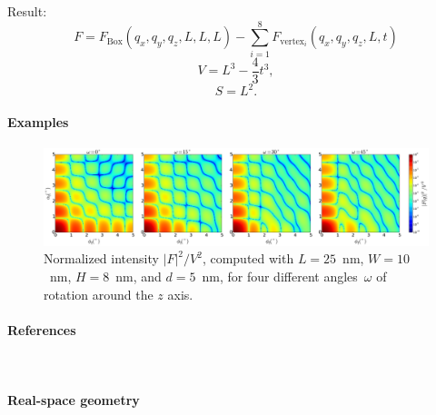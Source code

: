 Result:
\begin{equation*}
F =F_{\text{Box}}(q_x,q_y,q_z, L, L, L) - \sum_{i=1}^8 F_{\text{vertex}_i}(q_x, q_y, q_z, L, t)
\end{equation*}
\begin{equation*}
  V = L^3 - \dfrac{4}{3}t^3,
\end{equation*}
\begin{equation*}
  S = L^2.
\end{equation*}

\paragraph{Examples}\strut

\begin{figure}[H]
\begin{center}
\includegraphics[width=\textwidth]{fig/ff2/ff_TruncatedCube.pdf}
\end{center}
\caption{Normalized intensity $|F|^2/V^2$,
computed with $L=25$~nm, $W=10$~nm, $H=8$~nm, and $d=5$~nm,
for four different angles~$\omega$ of rotation around the $z$ axis.}
\end{figure}

\paragraph{References}\strut\\
\cite{HeSS74}


\label{STruncatedSphere}

\paragraph{Real-space geometry}\strut\\

